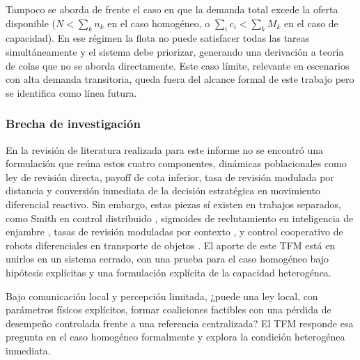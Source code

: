 Tampoco se aborda de frente el caso en que la demanda total excede la oferta disponible
($N < \sum_k n_k$ en el caso homogéneo, o $\sum_i c_i < \sum_k M_k$ en el caso de
capacidad). En ese régimen la flota no puede satisfacer todas las tareas
simultáneamente y el sistema debe priorizar, generando una derivación a teoría de colas que no se aborda directamente. Este caso límite, relevante en escenarios
con alta demanda transitoria, queda fuera del alcance formal de este trabajo pero se
identifica como línea futura.

\subsubsection{Brecha de investigación}

En la revisión de literatura realizada para este informe no se encontró una formulación que reúna estos
cuatro componentes, dinámicas poblacionales como ley de revisión directa, payoff de cota
inferior, tasa de revisión modulada por distancia y conversión inmediata de la decisión
estratégica en movimiento diferencial reactivo. Sin embargo, estas piezas sí existen en trabajos
separados, como Smith en control distribuido \citep{barreiro2017distributed}, sigmoides de
reclutamiento en inteligencia de enjambre \citep{theraulaz1999stigmergy}, tasas de
revisión moduladas por contexto \citep{sandholm2010population}, y control cooperativo de
robots diferenciales en transporte de objetos
\citep{ebel2024cooperative, rosenfelder2024force}.
El aporte de este TFM está en unirlos en un sistema cerrado, con una prueba para el caso
homogéneo bajo hipótesis explícitas y una formulación explícita de la capacidad
heterogénea.

Bajo comunicación local y percepción limitada, ¿puede una ley local, con parámetros
físicos explícitos, formar coaliciones factibles con una pérdida de desempeño controlada
frente a una referencia centralizada? El TFM responde esa pregunta en el caso homogéneo formalmente y explora la condición heterogénea inmediata.
